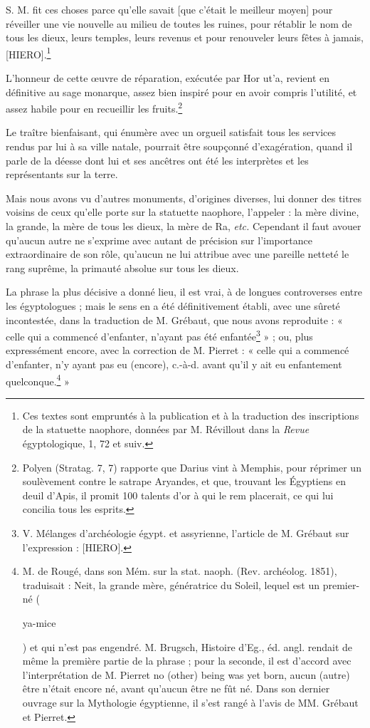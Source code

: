 \documentclass[a4paper, 11pt, oneside]{article}
\begin{document}
S. M. fit ces choses parce qu’elle savait [que c'était le meilleur moyen] pour réveiller une vie nouvelle au milieu de toutes les ruines, pour rétablir le nom de tous les dieux, leurs temples, leurs revenus et pour renouveler leurs fêtes à jamais, [HIERO].\footnote{Ces textes sont empruntés à la publication et à la traduction des inscriptions de la statuette naophore, données par M. Révillout dans la \emph{Revue} égyptologique, 1, 72 et suiv.}

L'honneur de cette œuvre de réparation, exécutée par Hor ut'a, revient en définitive au sage monarque, assez bien inspiré pour en avoir compris l'utilité, et assez habile pour en recueillir les fruits.\footnote{Polyen (Stratag. 7, 7) rapporte que Darius vint à Memphis, pour réprimer un soulèvement contre le satrape Aryandes, et que, trouvant les Égyptiens en deuil d'Apis, il promit 100 talents d'or à qui le rem placerait, ce qui lui concilia tous les esprits.}

Le traître bienfaisant, qui énumère avec un orgueil satisfait tous les services rendus par lui à sa ville natale, pourrait être soupçonné d'exagération, quand il parle de la déesse dont lui et ses ancêtres ont été les interprètes et les représentants sur la terre.

Mais nous avons vu d'autres monuments, d'origines diverses, lui donner des titres voisins de ceux qu'elle porte sur la statuette naophore, l'appeler : la mère divine, la grande, la mère de tous les dieux, la mère de Ra, \emph{etc.} Cependant il faut avouer qu'aucun autre ne s'exprime avec autant de précision sur l'importance extraordinaire de son rôle, qu'aucun ne lui attribue avec une pareille netteté le rang suprême, la primauté absolue sur tous les dieux.

La phrase la plus décisive a donné lieu, il est vrai, à de longues controverses entre les égyptologues ; mais le sens en a été définitivement établi, avec une sûreté incontestée, dans la traduction de M. Grébaut, que nous avons reproduite : « celle qui a commencé d'enfanter, n'ayant pas été enfantée\footnote{V. Mélanges d'archéologie égypt. et assyrienne, l'article de M. Grébaut sur l'expression : [HIERO].} » ; ou, plus expressément encore, avec la correction de M. Pierret : « celle qui a commencé d'enfanter, n'y ayant pas eu (encore), c.-à-d. avant qu'il y ait eu enfantement quelconque.\footnote{M. de Rougé, dans son Mém. sur la stat. naoph. (Rev. archéolog. 1851), traduisait : Neit, la grande mère, génératrice du Soleil, lequel est un premier-né (\begin{coptic}ya-mice\end{coptic}) et qui n'est pas engendré. M. Brugsch, Histoire d'Eg., éd. angl. rendait de même la première partie de la phrase ; pour la seconde, il est d'accord avec l'interprétation de M. Pierret no (other) being was yet born, aucun (autre) être n'était encore né, avant qu'aucun être ne fût né. Dans son dernier ouvrage sur la Mythologie égyptienne, il s'est rangé à l'avis de MM. Grébaut et Pierret.} »
\end{document}
